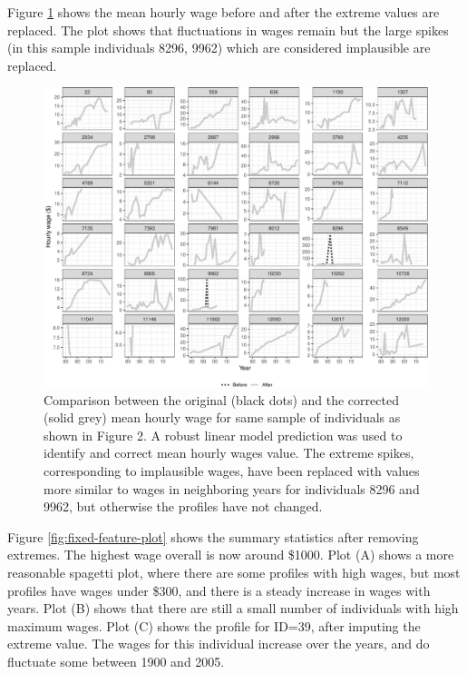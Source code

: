\documentclass{article}
\begin{document}
Figure \ref{fig:compare-plot} shows the mean hourly wage before and after the extreme values are replaced. The plot shows that fluctuations in wages remain but the large spikes (in this sample individuals 8296, 9962) which are considered implausible are replaced.

\begin{figure}

{\centering \includegraphics[width=0.9\linewidth]{figures/compare-plot-1} 

}

\caption{Comparison between the original (black dots) and the corrected (solid grey) mean hourly wage for same sample of individuals as shown in Figure 2. A robust linear model prediction was used to identify and correct mean hourly wages value. The extreme spikes, corresponding to implausible wages, have been replaced with values more similar to wages in neighboring years for individuals 8296 and 9962, but otherwise the profiles have not changed.}\label{fig:compare-plot}
\end{figure}

Figure \ref{fig:fixed-feature-plot} shows the summary statistics after removing extremes. The highest wage overall is now around \$1000. Plot (A) shows a more reasonable spagetti plot, where there are some profiles with high wages, but most profiles have wages under \$300, and there is a steady increase in wages with years. Plot (B) shows that there are still a small number of individuals with high maximum wages. Plot (C) shows the profile for ID=39, after imputing the extreme value. The wages for this individual increase over the years, and do fluctuate some between 1900 and 2005.
\end{document}
